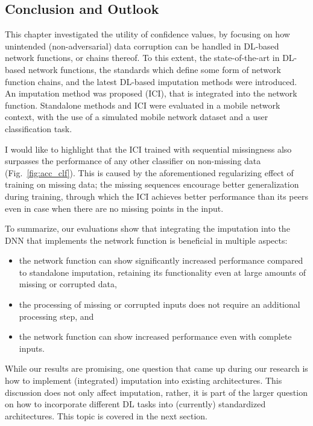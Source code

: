			\subsection{Conclusion and Outlook}
			
				This chapter investigated the utility of confidence values, by focusing on how unintended (non-adversarial) data corruption can be handled in \ac{DL}-based network functions, or chains thereof.
				To this extent, the state-of-the-art in \ac{DL}-based network functions, the standards which define some form of network function chains, and the latest \ac{DL}-based imputation methods were introduced.
				An imputation method was proposed (\ac{ICI}), that is integrated into the network function.
				Standalone methods and \ac{ICI} were evaluated in a mobile network context, with the use of a simulated mobile network dataset and a user classification task.
				
				I would like to highlight that the \ac{ICI} trained with sequential missingness also surpasses the performance of any other classifier on non-missing data (Fig.~\ref{fig:acc_clf}).
				This is caused by the aforementioned regularizing effect of training on missing data; the missing sequences encourage better generalization during training, through which the \ac{ICI} achieves better performance than its peers even in case when there are no missing points in the input.
		
				To summarize, our evaluations show that integrating the imputation into the \ac{DNN} that implements the network function is beneficial in multiple aspects: 
				\begin{itemize}
					\item 
					the network function can show significantly increased performance compared to standalone imputation, retaining its functionality even at large amounts of missing or corrupted data,
					
					\item 
					the processing of missing or corrupted inputs does not require an additional processing step, and
					
					\item
					the network function can show increased performance even with complete inputs.
				\end{itemize}
			
				While our results are promising, one question that came up during our research is how to implement (integrated) imputation into existing architectures.
				This discussion does not only affect imputation, rather, it is part of the larger question on how to incorporate different \ac{DL} tasks into (currently) standardized architectures.
				This topic is covered in the next section.
				
